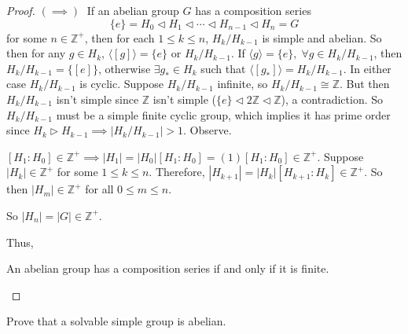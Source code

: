 \documentclass[addpoints,10pt]{exam}
\theoremstyle{plain}
\theoremstyle{definition}
\newtheorem{prob}[thm]{Problem}
\theoremstyle{plain}
\theoremstyle{plain}
\theoremstyle{definition}
\let\oldprob\prob
\let\endoldprob\endprob
\renewenvironment{prob}
  {\begin{singlespace}\oldprob}
  {\endoldprob\end{singlespace}}
\newcommand{\ZZ}{\ensuremath{\mathbb{Z}}}
\begin{document}
\begin{proof}
  \newpage $(\implies)\;$ If an abelian group $G$ has a composition series 
    $$\{e\}=H_{0}\triangleleft H_{1} \triangleleft \cdots \triangleleft H_{n-1}\triangleleft H_{n}=G$$
  for some $n\in \ZZ^{+}$, then for each $1\leq k\leq n$, $H_{k}/H_{k-1}$ is simple and abelian. So then for any $g\in H_{k}$, $\langle [g]\rangle=\{e\}$ or $H_{k}/H_{k-1}.$ If $\langle g\rangle=\{e\},\;\forall g\in H_{k}/H_{k-1}$, then $H_{k}/H_{k-1}=\{[e]\}$, otherwise $\exists g_{*}\in H_{k}$ such that $\langle [g_{*}]\rangle = H_{k}/H_{k-1}$. In either case $H_{k}/H_{k-1}$ is cyclic. Suppose $H_{k}/H_{k-1}$ infinite, so $H_{k}/H_{k-1}\cong \ZZ$. But then $H_{k}/H_{k-1}$ isn't simple since $\ZZ$ isn't simple ($\{e\}\triangleleft 2\ZZ\triangleleft \ZZ$), a contradiction. So $H_{k}/H_{k-1}$ must be a simple finite cyclic group, which implies it has prime order since $H_{k}\triangleright H_{k-1}\implies |H_{k}/H_{k-1}|>1$. Observe.
  \begin{center}
    $[H_{1}:H_{0}]\in \ZZ^{+}\implies |H_{1}|=|H_{0}|[H_{1}:H_{0}]=(1)[H_{1}:H_{0}]\in \ZZ^{+}$. Suppose $|H_{k}|\in \ZZ^{+}$ for some $1\leq k\leq n$. Therefore, $|H_{k+1}|=|H_{k}|[H_{k+1}:H_{k}]\in \ZZ^{+}$. So then $|H_{m}|\in \ZZ^{+}$ for all $0\leq m\leq n$.
  \end{center}
  So $|H_{n}|=|G|\in \ZZ^{+}$.

  Thus,

  \begin{center}
  An abelian group has a composition series if and only if it is finite.
  \end{center}
\end{proof}
\newpage
\begin{prob}
Prove that a solvable simple group is abelian.
\end{prob}
\end{document}
